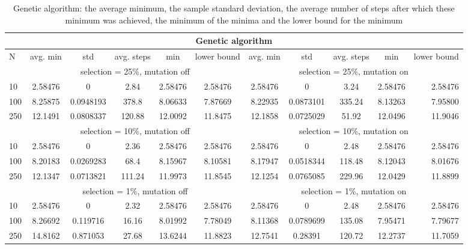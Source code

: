 \documentclass[10pt,a4paper]{article}
\begin{document}
\begin{table}[H]\footnotesize
  \centering
  \begin{tabular}{l | c c c c c | c c c c r }
    \hline
    \multicolumn{11}{c}{Genetic algorithm} \\
    \hline
    N & avg. min & std & avg. steps & min & lower bound & avg. min & std & avg. steps & min & lower bound\\
    \hline
    \multicolumn{1}{c}{} & \multicolumn{5}{c|}{selection = 25\%, mutation off} & \multicolumn{5}{|c}{selection = 25\%, mutation on} \\
    \hline
    10 & 2.58476 & 0 & 2.84 & 2.58476 & 2.58476 & 2.58476 & 0 & 3.24 & 2.58476 & 2.58476\\
    100 & 8.25875 & 0.0948193 & 378.8 & 8.06633 & 7.87669 & 8.22935 & 0.0873101 & 335.24 & 8.13263 & 7.95800\\
    250 & 12.1491 & 0.0808337 & 120.88 & 12.0092 & 11.8475 & 12.1858 & 0.0725029 & 51.92 & 12.0496 & 11.9046\\
\hline
    \multicolumn{1}{c}{} & \multicolumn{5}{c|}{selection = 10\%, mutation off} & \multicolumn{5}{|c}{selection = 10\%, mutation on} \\
    \hline
    10 & 2.58476 & 0 & 2.36 & 2.58476 & 2.58476 & 2.58476 & 0 & 2.48 & 2.58476 & 2.58476\\
    100 & 8.20183 & 0.0269283 & 68.4 & 8.15967 & 8.10581 & 8.17947 & 0.0518344 & 118.48 & 8.12043 & 8.01676\\
    250 & 12.1347 & 0.0713821 & 111.24 & 11.9973 & 11.8545 & 12.1254 & 0.0765085 & 229.96 & 12.0429 & 11.8899\\
    \hline
    \multicolumn{1}{c}{} & \multicolumn{5}{c|}{selection = 1\%, mutation off} & \multicolumn{5}{|c}{selection = 1\%, mutation on} \\
    \hline
    10 & 2.58476 & 0 & 2.32 & 2.58476 & 2.58476 & 2.58476 & 0 & 2.48 & 2.58476 & 2.58476\\
    100 & 8.26692 & 0.119716 & 16.16 & 8.01992 & 7.78049 & 8.11368 & 0.0789699 & 135.08 & 7.95471 & 7.79677\\
    250 & 14.8162 & 0.871053 & 27.68 & 13.6244 & 11.8823 & 12.7541 & 0.28391 & 120.72 & 12.2737 & 11.7059\\
    \hline    
  \end{tabular}
  \caption{Genetic algorithm: the average minimum, the sample standard deviation, the average number of steps after which these minimum was achieved, the minimum of the minima and the lower bound for the minimum}
  \label{tab:gen_random}
\end{table}
\end{document}
